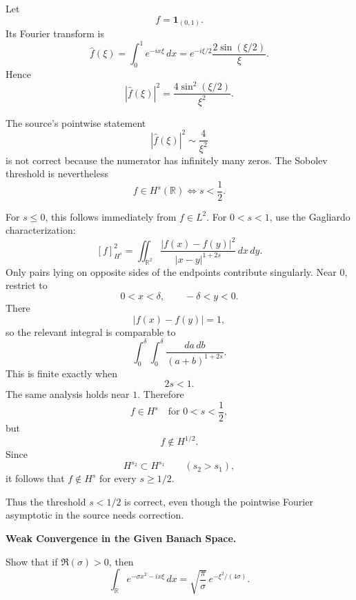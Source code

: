 \begin{solution}
Let
\[
f=\mathbf1_{(0,1)}.
\]
Its Fourier transform is
\[
\widehat f(\xi)
=
\int_0^1e^{-ix\xi}\,dx
=
e^{-i\xi/2}
\frac{2\sin(\xi/2)}{\xi}.
\]
Hence
\[
|\widehat f(\xi)|^2
=
\frac{4\sin^2(\xi/2)}{\xi^2}.
\]

The source's pointwise statement
\[
|\widehat f(\xi)|^2\sim\frac4{\xi^2}
\]
is not correct because the numerator has infinitely many zeros. The Sobolev threshold is
nevertheless
\[
\boxed{
f\in H^s(\mathbb R)
\iff
s<\frac12.
}
\]

For \(s\le0\), this follows immediately from \(f\in L^2\). For \(0<s<1\), use the
Gagliardo characterization:
\[
[f]_{H^s}^2
=
\iint_{\mathbb R^2}
\frac{|f(x)-f(y)|^2}{|x-y|^{1+2s}}\,dx\,dy.
\]
Only pairs lying on opposite sides of the endpoints contribute singularly. Near \(0\),
restrict to
\[
0<x<\delta,
\qquad
-\delta<y<0.
\]
There
\[
|f(x)-f(y)|=1,
\]
so the relevant integral is comparable to
\[
\int_0^\delta\int_0^\delta
\frac{da\,db}{(a+b)^{1+2s}}.
\]
This is finite exactly when
\[
2s<1.
\]
The same analysis holds near \(1\). Therefore
\[
f\in H^s
\quad\text{for }0<s<\frac12,
\]
but
\[
f\notin H^{1/2}.
\]
Since
\[
H^{s_2}\subset H^{s_1}
\qquad(s_2>s_1),
\]
it follows that \(f\notin H^s\) for every \(s\ge1/2\).

Thus the threshold \(s<1/2\) is correct, even though the pointwise Fourier asymptotic in the
source needs correction.
\end{solution}


\begin{problem}[CP-II-0522]
\label{prob:cp-ii-0522}
\textbf{Weak Convergence in the Given Banach Space.}

\hspace*{1.5em}Show that if $\Re(\sigma)>0$, then
		\[
		\int_{\mathbb{R}} e^{-\sigma x^2 - i x \xi}\, dx
		= \sqrt{\frac{\pi}{\sigma}}\, e^{-\xi^2/(4\sigma)}.
		\]
\end{problem}

